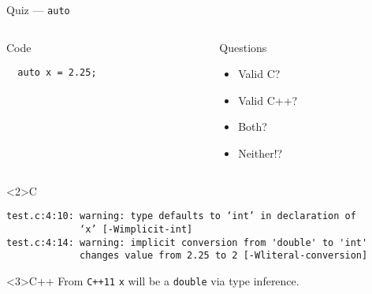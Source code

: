 \documentclass[presentation,aspectratio=169]{beamer}
\begin{document}
\begin{frame}[fragile,label={sec:org23c4234}]{Quiz — \texttt{auto}}
 \begin{columns}
\begin{column}{0.48\columnwidth}
\begin{block}{Code}
\begin{verbatim}
  auto x = 2.25;
\end{verbatim}
\end{block}
\end{column}

\begin{column}{0.48\columnwidth}
\begin{block}{Questions}
\begin{itemize}
\item Valid C?
\item Valid C++?
\item Both?
\item Neither!?
\end{itemize}
\end{block}
\end{column}
\end{columns}

\begin{block}<2>{C}
\begin{verbatim}
test.c:4:10: warning: type defaults to ‘int’ in declaration of
             ‘x’ [-Wimplicit-int]
test.c:4:14: warning: implicit conversion from 'double' to 'int'
             changes value from 2.25 to 2 [-Wliteral-conversion]
\end{verbatim}

\end{block}
\vspace{-3cm}
\begin{block}<3>{C++}
From \texttt{C++11} \texttt{x} will be a \texttt{double} via type inference.
\end{block}
\end{frame}

\end{document}
